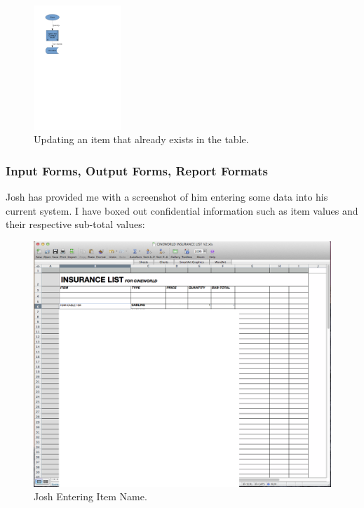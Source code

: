 \begin{figure}[H]
    \centerline{\includegraphics[width=125px]{./Analysis/Dataflow/DFD_analysis_update_item.pdf}}
    \caption{Updating an item that already exists in the table.} \label{fig:print_function_result}
\end{figure}

\newpage

\subsubsection{Input Forms, Output Forms, Report Formats}

Josh has provided me with a screenshot of him entering some data into his current system. I have boxed out confidential information such as item values and their respective sub-total values:\\

\begin{figure}[H]
    \includegraphics[width=\textwidth]{./Analysis/Forms/enter_data.png}
    \caption{Josh Entering Item Name.} \label{fig:print_function_result}
\end{figure}

